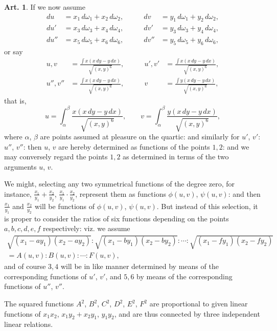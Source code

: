 \documentclass[11pt,a4paper]{article}
\theoremstyle{definition}
\newtheorem{art}{Art.}[section]
\begin{document}
\begin{art}\label{art:155}
If we now assume
\begin{align*}
du &= x_1\,d\omega_1 + x_2\,d\omega_2, &\qquad dv &= y_1\,d\omega_1 + y_2\,d\omega_2, \\
du' &= x_3\,d\omega_3 + x_4\,d\omega_4, &\qquad dv' &= y_3\,d\omega_3 + y_4\,d\omega_4, \\
du'' &= x_5\,d\omega_5 + x_6\,d\omega_6, &\qquad dv'' &= y_5\,d\omega_5 + y_6\,d\omega_6,
\end{align*}
or say
\begin{align*}
u,v &= \frac{\int x(x\,dy - y\,dx)}{\sqrt{(x,y)^6}}, &\qquad
u',v' &= \frac{\int x(x\,dy - y\,dx)}{\sqrt{(x,y)^6}}, \\
u'',v'' &= \frac{\int x(x\,dy - y\,dx)}{\sqrt{(x,y)^6}}, &\qquad
v &= \frac{\int y(x\,dy - y\,dx)}{\sqrt{(x,y)^6}},
\end{align*}
that is,
\[
u = \int_{\alpha}^{\beta} \frac{x(x\,dy - y\,dx)}{\sqrt{(x,y)^6}}, \qquad
v = \int_{\alpha}^{\beta} \frac{y(x\,dy - y\,dx)}{\sqrt{(x,y)^6}},
\]
where $\alpha$, $\beta$ are points assumed at pleasure on the quartic: and similarly for $u'$, $v'$: $u''$, $v''$: then $u$, $v$ are hereby determined as functions of the points $1,2$: and we may conversely regard the points $1,2$ as determined in terms of the two arguments $u$, $v$.

We might, selecting any two symmetrical functions of the degree zero, for instance, $\frac{x_1}{y_1} + \frac{x_2}{y_2}$, $\frac{x_1}{y_1} \cdot \frac{x_2}{y_2}$, represent them as functions $\phi(u,v)$, $\psi(u,v)$: and then $\frac{x_1}{y_1}$ and $\frac{x_2}{y_2}$ will be functions of $\phi(u,v)$, $\psi(u,v)$. But instead of this selection, it is proper to consider the ratios of six functions depending on the points $a,b,c,d,e,f$ respectively: viz. we assume
\begin{multline*}
\sqrt{(x_1-ay_1)(x_2-ay_2)} : \sqrt{(x_1-by_1)(x_2-by_2)} : \cdots : \sqrt{(x_1-fy_1)(x_2-fy_2)} \\
= A(u,v) : B(u,v) : \cdots : F(u,v),
\end{multline*}
and of course $3,4$ will be in like manner determined by means of the corresponding functions of $u'$, $v'$, and $5,6$ by means of the corresponding functions of $u''$, $v''$.

The squared functions $A^2$, $B^2$, $C^2$, $D^2$, $E^2$, $F^2$ are proportional to given linear functions of $x_1x_2$, $x_1y_2+x_2y_1$, $y_1y_2$, and are thus connected by three independent linear relations.
\end{art}
\end{document}
